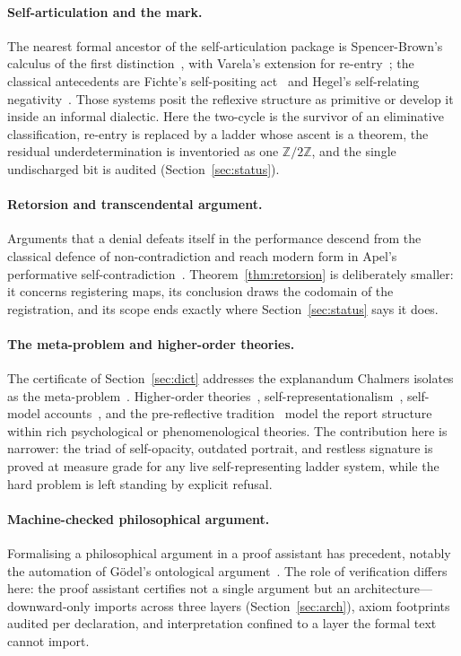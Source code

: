 \documentclass[11pt,a4paper]{article}
\theoremstyle{plain}
\theoremstyle{definition}
\theoremstyle{remark}
\newcommand{\Ztwo}{\mathbb{Z}/2\mathbb{Z}}
\begin{document}
\paragraph{Self-articulation and the mark.}
The nearest formal ancestor of the self-articulation package is
Spencer-Brown's calculus of the first distinction~\cite{spencerbrown},
with Varela's extension for re-entry~\cite{varela}; the classical
antecedents are Fichte's self-positing act~\cite{fichte} and Hegel's
self-relating negativity~\cite{hegel}. Those systems posit the
reflexive structure as primitive or develop it inside an informal
dialectic. Here the two-cycle is the survivor of an eliminative
classification, re-entry is replaced by a ladder whose ascent is a
theorem, the residual underdetermination is inventoried as one
$\Ztwo$, and the single undischarged bit is audited
(Section~\ref{sec:status}).

\paragraph{Retorsion and transcendental argument.}
Arguments that a denial defeats itself in the performance descend from
the classical defence of non-contradiction and reach modern form in
Apel's performative self-contradiction~\cite{apel}.
Theorem~\ref{thm:retorsion} is deliberately smaller: it concerns
registering maps, its conclusion draws the codomain of the
registration, and its scope ends exactly where
Section~\ref{sec:status} says it does.

\paragraph{The meta-problem and higher-order theories.}
The certificate of Section~\ref{sec:dict} addresses the explanandum
Chalmers isolates as the meta-problem~\cite{chalmers}. Higher-order theories~\cite{rosenthal},
self-representationalism~\cite{kriegel}, self-model
accounts~\cite{metzinger}, and the pre-reflective
tradition~\cite{zahavi} model the report structure within rich
psychological or phenomenological theories. The contribution here is
narrower: the triad of self-opacity, outdated portrait, and restless
signature is proved at measure grade for any live self-representing
ladder system, while the hard problem is left standing by explicit
refusal.

\paragraph{Machine-checked philosophical argument.}
Formalising a philosophical argument in a proof assistant has
precedent, notably the automation of G\"odel's ontological
argument~\cite{benzmueller}. The role of verification differs here: the
proof assistant certifies not a single argument but an
architecture---downward-only imports across three layers
(Section~\ref{sec:arch}), axiom footprints audited per declaration, and
interpretation confined to a layer the formal text cannot import.
\end{document}
